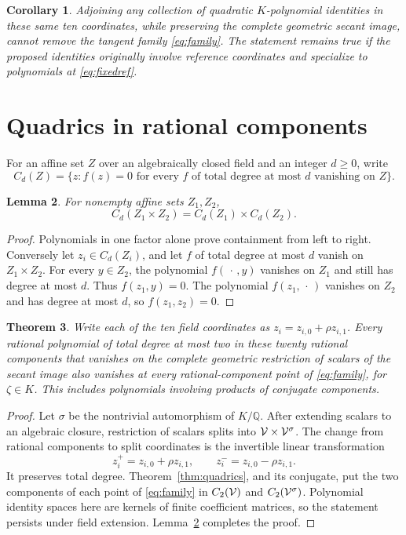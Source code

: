 \documentclass[11pt,a4paper]{article}
\newtheorem{theorem}{Theorem}[section]
\newtheorem{lemma}[theorem]{Lemma}
\newtheorem{corollary}[theorem]{Corollary}
\newcommand{\Q}{\mathbb Q}\newcommand{\Z}{\mathbb Z}
\begin{document}
\begin{corollary}\label{cor:noKrepair}
Adjoining any collection of quadratic $K$-polynomial identities in
these same ten coordinates, while preserving the complete geometric
secant image, cannot remove the tangent family
\eqref{eq:family}. The statement remains true if the proposed
identities originally involve reference coordinates and specialize
to polynomials at \eqref{eq:fixedref}.
\end{corollary}

\section{Quadrics in rational components}
For an affine set $Z$ over an algebraically closed field and an
integer $d\ge0$, write
\[
 C_d(Z)=\{z: f(z)=0\text{ for every }f\text{ of total degree at most }d
                         \text{ vanishing on }Z\}.
\]

\begin{lemma}\label{lem:product}
For nonempty affine sets $Z_1,Z_2$,
\[
                       C_d(Z_1\times Z_2)=C_d(Z_1)\times C_d(Z_2).
\]
\end{lemma}
\begin{proof}
Polynomials in one factor alone prove containment from left to right.
Conversely let $z_i\in C_d(Z_i)$, and let $f$ of total degree at most
$d$ vanish on $Z_1\times Z_2$. For every $y\in Z_2$, the polynomial
$f(\,\cdot\,,y)$ vanishes on $Z_1$ and still has degree at most $d$.
Thus $f(z_1,y)=0$. The polynomial $f(z_1,\,\cdot\,)$ vanishes on
$Z_2$ and has degree at most $d$, so $f(z_1,z_2)=0$.
\end{proof}

\begin{theorem}\label{thm:rational}
Write each of the ten field coordinates as $z_i=z_{i,0}+\rho z_{i,1}$.
Every rational polynomial of total degree at most two in these twenty
rational components that vanishes on the complete geometric
restriction of scalars of the secant image also vanishes at every
rational-component point of \eqref{eq:family}, for $\zeta\in K$.
This includes polynomials involving products of conjugate components.
\end{theorem}
\begin{proof}
Let $\sigma$ be the nontrivial automorphism of $K/\Q$. After extending
scalars to an algebraic closure, restriction of scalars splits into
$\mathcal V\times\mathcal V^\sigma$. The change from rational components to
split coordinates is the invertible linear transformation
\[
                  z_i^+=z_{i,0}+\rho z_{i,1},\qquad
                  z_i^-=z_{i,0}-\rho z_{i,1}.
\]
It preserves total degree. Theorem~\ref{thm:quadrics}, and its
conjugate, put the two components of each point of
\eqref{eq:family} in $C_2(\mathcal V)$ and $C_2(\mathcal V^\sigma)$.
Polynomial identity spaces here are kernels of finite coefficient
matrices, so the statement persists under field extension.
Lemma~\ref{lem:product} completes the proof.
\end{proof}
\end{document}
